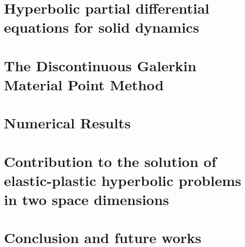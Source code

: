 \documentclass[10pt,a4paper,twoside]{report}
\begin{document}
\chapter{Hyperbolic partial differential equations for solid dynamics}
\label{chap:chap2}


\chapter{The Discontinuous Galerkin Material Point Method}
\label{chap:chap3}


\chapter{Numerical Results}
\label{chap:chap4}


\chapter{Contribution to the solution of elastic-plastic hyperbolic problems in two space dimensions}
\label{chap:chap5}



\chapter{Conclusion and future works}









\end{document}
